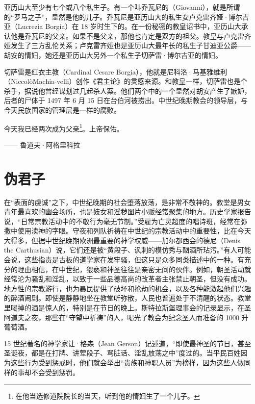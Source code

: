 亚历山大至少有七个或八个私生子。有一个叫乔瓦尼的（Giovanni），就是所谓的“罗马之子”，显然是他的儿子。乔瓦尼是亚历山大的私生女卢克雷齐娅·博尔吉亚（Lucrezia Borgia）在 18 岁时生下的。在一份秘密的教皇诏书中，亚历山大承认他是乔瓦尼的父亲。如果不是父亲，那他也肯定是双方的祖父。教皇与卢克雷齐娅发生了三方乱伦关系；卢克雷齐娅也是亚历山大最年长的私生子甘迪亚公爵——胡安的情妇，她还是亚历山大另外一个私生子切萨雷·博尔吉亚的情妇。

切萨雷是红衣主教（Cardinal Cesare Borgia），他就是尼科洛·马基雅维利（NiccolòMachia-velli）创作《君主论》的灵感来源。和教皇一样，切萨雷也是个杀手，据说他曾经谋划过几起杀人案。他们两个中的一个显然对胡安产生了嫉妒，后者的尸体于 1497 年 6 月 15 日在台伯河被捞出。中世纪晚期教会的领导层，与今天民族国家的管理层是一样的腐败。

\begin{tcolorbox}
\kaishu 今天我已经两次成为父亲\footnote{在他当选修道院院长的当天，听到他的情妇生了一个儿子。}。上帝保佑。
\begin{flushright}
—— 鲁道夫·阿格里科拉  
\end{flushright} 
\end{tcolorbox}

\section{伪君子}
在“表面的虔诚”之下，中世纪晚期的社会堕落放荡，是非常不敬神的。教堂是男女青年最喜欢的幽会场所，也是妓女和淫秽图片小贩经常聚集的地方。历史学家报告说，“日常宗教活动中的不敬行为毫无节制。”受雇为亡灵超度的唱诗班，经常在弥撒中使用渎神的字眼。守夜和列队祈祷在中世纪的宗教活动中的重要性，比在今天大得多，但据中世纪晚期欧洲最重要的神学权威——加尔都西会的德尼（Denis the Carthusian）说，它们还是被“黄段子、讽刺的模仿秀与酗酒所玷污。”有人可能会说，这些指责是古板的道学家在发牢骚，但这只是众多同类描述中的一种。有充分的理由相信，在中世纪，猥亵和神圣往往是亲密无间的伙伴。例如，朝圣活动就经常沦为骚乱和淫乱，以致于一些品德高尚的改革者主张禁止朝圣，但没有成功。地方性的宗教游行，也为暴民提供了破坏和抢劫的机会，以及各种能激起他们兴趣的醉酒闹剧。即使是静静地坐在教堂听弥散，人民也普遍处于不清醒的状态。教堂里喝掉的酒是惊人的，特别是在节日的晚上。斯特拉斯堡理事会的记录显示，在圣阿道夫之夜，那些在“守望中祈祷”的人，喝光了教会为纪念圣人而准备的 1000 升葡萄酒。

15 世纪著名的神学家让·格森（Jean Gerson）记述道，“即使最神圣的节日，甚至圣诞夜，都是在打牌、讲荤段子、骂脏话、淫乱放荡之中”度过的。当平民百姓因为这些行为受到惩戒时，他们就会举出“贵族和神职人员”为榜样，因为这些人做同样的事却不会受到惩罚。

